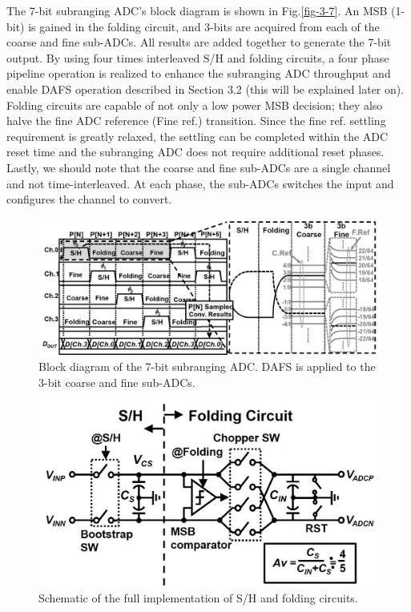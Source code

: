 The 7-bit subranging ADC's block diagram is shown in Fig.\ref{fig-3-7}. An MSB (1-bit) is gained in the folding circuit, and 3-bits are acquired from each of the coarse and fine sub-ADCs. All results are added together to generate the 7-bit output. By using four times interleaved S/H and folding circuits, a four phase pipeline operation is realized to enhance the subranging ADC throughput and enable DAFS operation described in Section 3.2 (this will be explained later on). Folding circuits are capable of not only a low power MSB decision; they also halve the fine ADC reference (Fine ref.) transition. Since the fine ref. settling requirement is greatly relaxed, the settling can be completed within the ADC reset time and the subranging ADC does not require additional reset phases. Lastly, we should note that the coarse and fine sub-ADCs are a single channel and not time-interleaved. At each phase, the sub-ADCs switches the input and configures the channel to convert. 

\begin{figure}
\centering
  \includegraphics[width=1\textwidth]{figure/chap3/fig8.jpg}
  \caption{Block diagram of the 7-bit subranging ADC. DAFS is applied to the 3-bit coarse and fine sub-ADCs.}
  \label{fig-3-8}
\end{figure}

\begin{figure}
\centering
  \includegraphics[width=1\textwidth]{figure/chap3/fig9a.jpg}
  \caption{Schematic of the full implementation of S/H and folding circuits.}
  \label{fig-3-9}
\end{figure}

